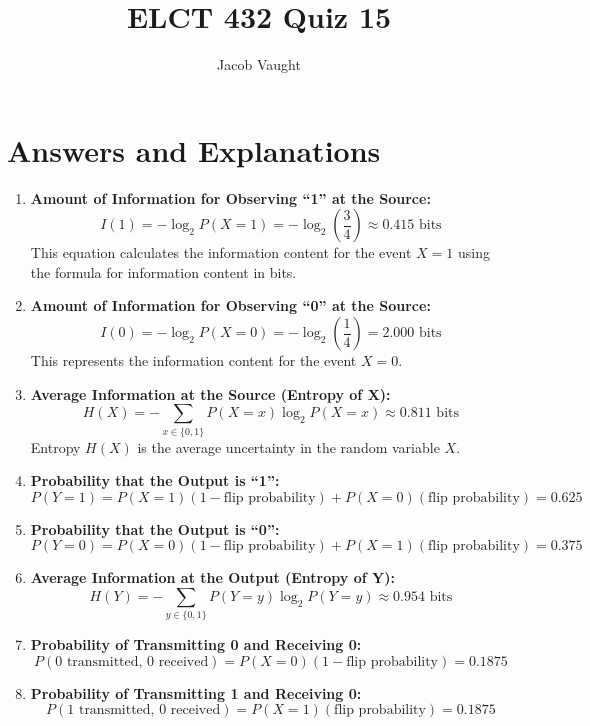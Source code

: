 \documentclass{article}
\title{ELCT 432 Quiz 15}
\author{Jacob Vaught}
\date{}
\begin{document}
\maketitle

\section*{Answers and Explanations}

\begin{enumerate}
    \item \textbf{Amount of Information for Observing “1” at the Source:}
    \[ I(1) = -\log_2 P(X=1) = -\log_2 \left( \frac{3}{4} \right) \approx 0.415 \text{ bits} \]
    This equation calculates the information content for the event \( X=1 \) using the formula for information content in bits.

    \item \textbf{Amount of Information for Observing “0” at the Source:}
    \[ I(0) = -\log_2 P(X=0) = -\log_2 \left( \frac{1}{4} \right) = 2.000 \text{ bits} \]
    This represents the information content for the event \( X=0 \).

    \item \textbf{Average Information at the Source (Entropy of X):}
    \[ H(X) = -\sum_{x \in \{0,1\}} P(X=x) \log_2 P(X=x) \approx 0.811 \text{ bits} \]
    Entropy \( H(X) \) is the average uncertainty in the random variable \( X \).

    \item \textbf{Probability that the Output is “1”:}
    \[ P(Y=1) = P(X=1)(1 - \text{flip probability}) + P(X=0)(\text{flip probability}) = 0.625 \]

    \item \textbf{Probability that the Output is “0”:}
    \[ P(Y=0) = P(X=0)(1 - \text{flip probability}) + P(X=1)(\text{flip probability}) = 0.375 \]

    \item \textbf{Average Information at the Output (Entropy of Y):}
    \[ H(Y) = -\sum_{y \in \{0,1\}} P(Y=y) \log_2 P(Y=y) \approx 0.954 \text{ bits} \]

    \item \textbf{Probability of Transmitting 0 and Receiving 0:}
    \[ P(0 \text{ transmitted, } 0 \text{ received}) = P(X=0)(1 - \text{flip probability}) = 0.1875 \]

    \item \textbf{Probability of Transmitting 1 and Receiving 0:}
    \[ P(1 \text{ transmitted, } 0 \text{ received}) = P(X=1)(\text{flip probability}) = 0.1875 \]


\end{enumerate}
\end{document}
